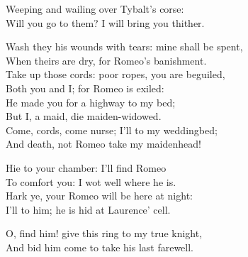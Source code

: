 \begin{speech}
Weeping and wailing over Tybalt's corse: \\
Will you go to them? I will bring you thither. \\
\end{speech}
\begin{speech}
Wash they his wounds with tears: mine shall be spent,
\\
When theirs are dry, for Romeo's banishment. \\
Take up those cords: poor ropes, you are beguiled, \\
Both you and I; for Romeo is exiled: \\
He made you for a highway to my bed; \\
But I, a maid, die maiden-widowed. \\
Come, cords, come nurse; I'll to my weddingbed; \\
And death, not Romeo take my maidenhead! \\
\end{speech}
\begin{speech}
Hie to your chamber: I'll find Romeo \\
To comfort you: I wot well where he is. \\
Hark ye, your Romeo will be here at night: \\
I'll to him; he is hid at Laurence' cell. \\
\end{speech}
\begin{speech}
O, find him! give this ring to my true knight, \\

And bid him come to take his last farewell. 
\\
\end{speech}


